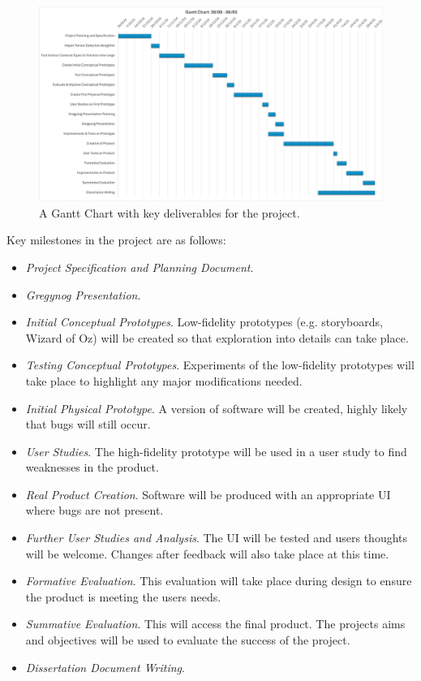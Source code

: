 \documentclass[12pt]{article}
\theoremstyle{plain}
\theoremstyle{definition}
\begin{document}
\begin{figure}[!htb]
  \centering
  \includegraphics[width=\linewidth]{Picture 1.png}
  \caption{A Gantt Chart with key deliverables for the project. }
  \label{fig:figure3}
\end{figure}

Key milestones in the project are as follows:
\begin{itemize}
\item \emph{Project Specification and Planning Document}.
\item \emph{Gregynog Presentation}.
\item \emph{Initial Conceptual Prototypes}. Low-fidelity prototypes (e.g. storyboards, Wizard of Oz) will be created so that exploration into details can take place.
\item \emph{Testing Conceptual Prototypes}. Experiments of the low-fidelity prototypes will take place to highlight any major modifications needed.
\item \emph{Initial Physical Prototype}. A version of software will be created, highly likely that bugs will still occur. 
\item \emph{User Studies}. The high-fidelity prototype will be used in a user study to find weaknesses in the product.
\item \emph{Real Product Creation}. Software will be produced with an appropriate UI where bugs are not present.
\item \emph{Further User Studies and Analysis}. The UI will be tested and users thoughts will be welcome. Changes after feedback will also take place at this time.
\item \emph{Formative Evaluation}. This evaluation will take place during design to ensure the product is meeting the users needs.
\item \emph{Summative Evaluation}. This will access the final product. The projects aims and objectives will be used to evaluate the success of the project.
\item \emph{Dissertation Document Writing}.
\end{itemize}
\end{document}
